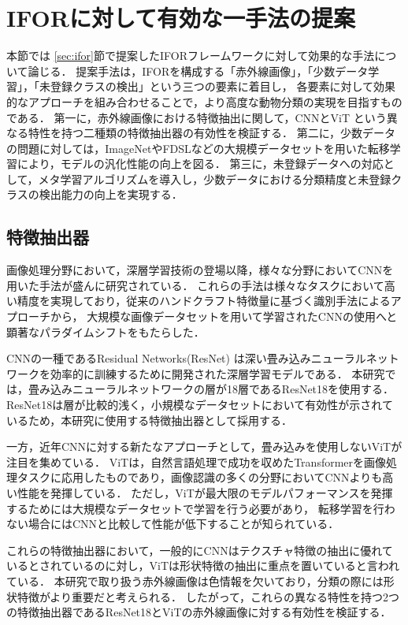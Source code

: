 \documentclass[a4paper,11pt,nomag]{jsreport}
\begin{document}
\section{IFORに対して有効な一手法の提案}

本節では \ref{sec:ifor}節で提案したIFORフレームワークに対して効果的な手法について論じる．
提案手法は，IFORを構成する「赤外線画像」，「少数データ学習」，「未登録クラスの検出」という三つの要素に着目し，
各要素に対して効果的なアプローチを組み合わせることで，より高度な動物分類の実現を目指すものである．
第一に，赤外線画像における特徴抽出に関して，CNNとViT \cite{vit}という異なる特性を持つ二種類の特徴抽出器の有効性を検証する．
第二に，少数データの問題に対しては，ImageNetやFDSLなどの大規模データセットを用いた転移学習により，モデルの汎化性能の向上を図る．
第三に，未登録データへの対応として，メタ学習アルゴリズムを導入し，少数データにおける分類精度と未登録クラスの検出能力の向上を実現する．

\subsection{特徴抽出器}

画像処理分野において，深層学習技術の登場以降，様々な分野においてCNNを用いた手法が盛んに研究されている．
これらの手法は様々なタスクにおいて高い精度を実現しており，従来のハンドクラフト特徴量に基づく識別手法によるアプローチから，
大規模な画像データセットを用いて学習されたCNNの使用へと顕著なパラダイムシフトをもたらした．

CNNの一種であるResidual Networks(ResNet) \cite{resnet}は深い畳み込みニューラルネットワークを効率的に訓練するために開発された深層学習モデルである．
本研究では，畳み込みニューラルネットワークの層が18層であるResNet18を使用する．
ResNet18は層が比較的浅く，小規模なデータセットにおいて有効性が示されているため，本研究に使用する特徴抽出器として採用する．

一方，近年CNNに対する新たなアプローチとして，畳み込みを使用しないViTが注目を集めている．
ViTは，自然言語処理で成功を収めたTransformerを画像処理タスクに応用したものであり，画像認識の多くの分野においてCNNよりも高い性能を発揮している．
ただし，ViTが最大限のモデルパフォーマンスを発揮するためには大規模なデータセットで学習を行う必要があり，
転移学習を行わない場合にはCNNと比較して性能が低下することが知られている\cite{vit}．

これらの特徴抽出器において，一般的にCNNはテクスチャ特徴の抽出に優れているとされているのに対し，ViTは形状特徴の抽出に重点を置いていると言われている\cite{feature}．
本研究で取り扱う赤外線画像は色情報を欠いており，分類の際には形状特徴がより重要だと考えられる．
したがって，これらの異なる特性を持つ2つの特徴抽出器であるResNet18とViTの赤外線画像に対する有効性を検証する．
\end{document}
